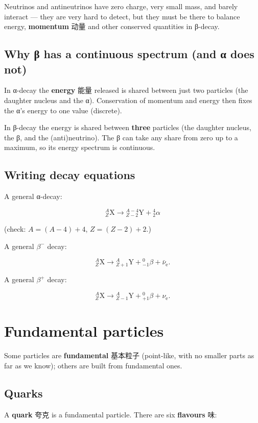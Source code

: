 \documentclass[11pt]{article}
\begin{document}
Neutrinos and antineutrinos have zero charge, very small mass, and barely interact — they are very hard to detect, but they must be there to balance energy, \textbf{momentum} 动量 and other conserved quantities in β-decay.

\subsection*{Why β has a continuous spectrum (and α does not)}

In α-decay the \textbf{energy} 能量 released is shared between just two particles (the daughter nucleus and the α). Conservation of momentum and energy then fixes the α's energy to one value (discrete).

In β-decay the energy is shared between \textbf{three} particles (the daughter nucleus, the β, and the (anti)neutrino). The β can take any share from zero up to a maximum, so its energy spectrum is continuous.

\subsection*{Writing decay equations}

A general α-decay:

\[
^{A}_{Z}\text{X} \to {}^{A-4}_{Z-2}\text{Y} + {}^{4}_{2}\alpha
\]

(check: $A = (A-4) + 4$, $Z = (Z-2) + 2$.)

A general $\beta^{-}$ decay:

\[
^{A}_{Z}\text{X} \to {}^{A}_{Z+1}\text{Y} + {}^{0}_{-1}\beta + \bar{\nu}_{\text{e}}.
\]

A general $\beta^{+}$ decay:

\[
^{A}_{Z}\text{X} \to {}^{A}_{Z-1}\text{Y} + {}^{0}_{+1}\beta + \nu_{\text{e}}.
\]

\section*{Fundamental particles}

Some particles are \textbf{fundamental} 基本粒子 (point-like, with no smaller parts as far as we know); others are built from fundamental ones.

\subsection*{Quarks}

A \textbf{quark} 夸克 is a fundamental particle. There are six \textbf{flavours} 味:
\end{document}
